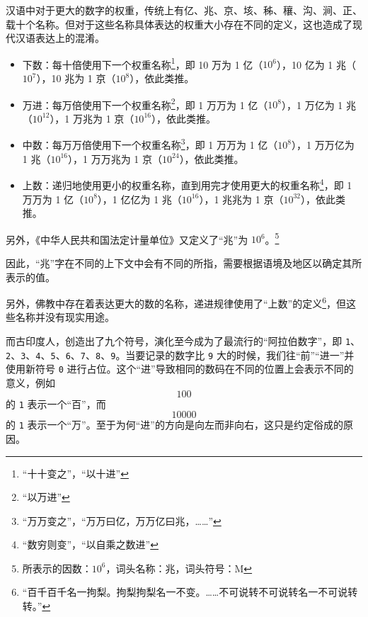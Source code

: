         \begin{displayquote}
            汉语中对于更大的数字的权重，传统上有亿、兆、京、垓、秭、穰、沟、涧、正、载十个名称。但对于这些名称具体表达的权重大小存在不同的定义，这也造成了现代汉语表达上的混淆。

            \begin{itemize}
                \item 下数：每十倍使用下一个权重名称\footnote{“十十变之”\cite[卷上 12]{zhenluan}，“以十进”\cite[卷一 15]{yunzhi}}，即 10 万为 1 亿（$10^6$），10 亿为 1 兆（$10^7$），10 兆为 1 京（$10^8$），依此类推。
                \item 万进：每万倍使用下一个权重名称\footnote{“以万进”\cite[卷一 15]{yunzhi}}，即 1 万万为 1 亿（$10^8$），1 万亿为 1 兆（$10^{12}$），1 万兆为 1 京（$10^{16}$），依此类推。
                \item 中数：每万万倍使用下一个权重名称\footnote{“万万变之”\cite[卷上 12]{zhenluan}，“万万曰亿，万万亿曰兆，……”\cite[卷上 3]{sunzi}}，即 1 万万为 1 亿（$10^8$），1 万万亿为 1 兆（$10^{16}$），1 万万兆为 1 京（$10^{24}$），依此类推。
                \item 上数：递归地使用更小的权重名称，直到用完才使用更大的权重名称\footnote{“数穷则变”\cite[卷上 12]{zhenluan}，“以自乘之数进”\cite[卷上 15]{yunzhi}}，即 1 万万为 1 亿（$10^8$），1 亿亿为 1 兆（$10^{16}$），1 兆兆为 1 京（$10^{32}$），依此类推。
            \end{itemize}
            另外，《中华人民共和国法定计量单位》又定义了“兆”为 $10^6$。\footnote{所表示的因数：$10^6$，词头名称：兆，词头符号：M\cite[附件 表 5]{gwy}}

            因此，“兆”字在不同的上下文中会有不同的所指，需要根据语境及地区以确定其所表示的值。

            另外，佛教中存在着表达更大的数的名称，递进规律使用了“上数”的定义\footnote{“百千百千名一拘梨。拘梨拘梨名一不变。……不可说转不可说转名一不可说转转。”\cite[卷第二十九 1]{bhadra}}，但这些名称并没有现实用途。
        \end{displayquote}

        而古印度人，创造出了九个符号，演化至今成为了最流行的“阿拉伯数字”，即 \texttt{1}、\texttt{2}、\texttt{3}、\texttt{4}、\texttt{5}、\texttt{6}、\texttt{7}、\texttt{8}、\texttt{9}。当要记录的数字比 \texttt{9} 大的时候，我们往“前”“进一”并使用新符号 \texttt{0} 进行占位。这个“进”导致相同的数码在不同的位置上会表示不同的意义，例如 \[100\] 的 \texttt{1} 表示一个“百”，而 \[10000\]的 \texttt{1} 表示一个“万”。至于为何“进”的方向是向左而非向右，这只是约定俗成的原因。


